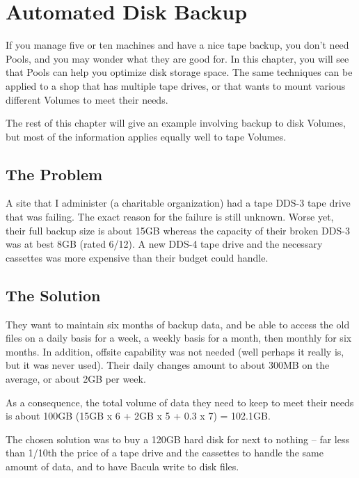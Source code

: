 
\chapter{Automated Disk Backup}
\label{PoolsChapter}

If you manage five or ten machines and have a nice tape backup, you don't need
Pools, and you may wonder what they are good for. In this chapter, you will
see that Pools can help you optimize disk storage space. The same techniques
can be applied to a shop that has multiple tape drives, or that wants to mount
various different Volumes to meet their needs. 

The rest of this chapter will give an example involving backup to disk
Volumes, but most of the information applies equally well to tape Volumes. 

\label{TheProblem}
\section{The Problem}

A site that I administer (a charitable organization) had a tape DDS-3 tape
drive that was failing. The exact reason for the failure is still unknown.
Worse yet, their full backup size is about 15GB whereas the capacity of their
broken DDS-3 was at best 8GB (rated 6/12). A new DDS-4 tape drive and the
necessary cassettes was more expensive than their budget could handle. 

\label{TheSolution}
\section{The Solution}

They want to maintain six months of backup data, and be able to access the old
files on a daily basis for a week, a weekly basis for a month, then monthly
for six months. In addition, offsite capability was not needed (well perhaps
it really is, but it was never used). Their daily changes amount to about
300MB on the average, or about 2GB per week. 

As a consequence, the total volume of data they need to keep to meet their
needs is about 100GB (15GB x 6 + 2GB x 5 + 0.3 x 7) = 102.1GB. 

The chosen solution was to buy a 120GB hard disk for next to nothing -- far
less than 1/10th the price of a tape drive and the cassettes to handle the
same amount of data, and to have Bacula write to disk files. 

